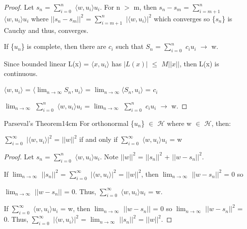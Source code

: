     \begin{proof}
        Let $s_n$ = $\sum_{i=0}^{n}$ $\langle w , u_i \rangle u_i$.
        For n $>$ m, then $s_n - s_m$
        = $\sum_{i=m+1}^{n}$ $\langle w , u_i \rangle u_i$
        where $||s_n - s_m||^2$
        = $\sum_{i=m+1}^{n}$ $|\langle w , u_i \rangle|^2$
        which converges so \{$s_n$\} is Cauchy and thus, converges.

        If \{$u_n$\} is complete, then there are $c_i$ such that
        $S_n$ = $\sum_{i=0}^n$ $c_i u_i$ $\rightarrow$ w.

        Since bounded linear L(x) = $\langle x , u_i \rangle$
        has $|L(x)|$ $\leq$ $M||x||$, then L(x) is continuous.

        \hspace{0.5cm}
        $\langle w , u_i \rangle$
        = $\langle \lim_{n \rightarrow \infty} S_n , u_i \rangle$
        = $\lim_{n \rightarrow \infty} \langle S_n , u_i \rangle$
        = $c_i$

        \hspace{0.5cm}
        $\lim_{n \rightarrow \infty}$ $\sum_{i=0}^{n}$ $\langle w , u_i \rangle u_i$
        = $\lim_{n \rightarrow \infty}$ $\sum_{i=0}^n$ $c_i u_i$ $\rightarrow$ w.
    \end{proof}

    \newpage



    \begin{wtheorem}{Parseval's Theorem}{14cm}
        For orthonormal \{$u_n$\} $\in$ $\mathcal{H}$ where w $\in$ $\mathcal{H}$,
        then:
        
        \hspace{0.5cm}
        $\sum_{i=0}^{\infty}$ $|\langle w , u_i \rangle|^2$ = $||w||^2$
        if and only if $\sum_{i=0}^{\infty}$ $\langle w , u_i \rangle u_i$ = w
    \end{wtheorem}

    \begin{proof}
        Let $s_n$ = $\sum_{i=0}^{n}$ $\langle w , u_i \rangle u_i$.
        Note $||w||^2$ = $||s_n||^2$ + $||w-s_n||^2$.

        If $\lim_{n \rightarrow \infty}$ $||s_n||^2$
        = $\sum_{i=0}^{\infty}$ $|\langle w , u_i \rangle|^2$ = $||w||^2$,
        then $\lim_{n \rightarrow \infty}$ $||w-s_n||^2$ = 0 so
        
        $\lim_{n \rightarrow \infty}$ $||w-s_n||$ = 0.
        Thus, $\sum_{i=0}^{\infty}$ $\langle w , u_i \rangle u_i$ = w.

        If $\sum_{i=0}^{\infty}$ $\langle w , u_i \rangle u_i$ = w,
        then $\lim_{n \rightarrow \infty}$ $||w-s_n||$ = 0
        so $\lim_{n \rightarrow \infty}$ $||w-s_n||^2$ = 0.
        Thus, $\sum_{i=0}^{\infty}$ $|\langle w , u_i \rangle|^2$
        = $\lim_{n \rightarrow \infty}$ $||s_n||^2$ = $||w||^2$.
    \end{proof}

